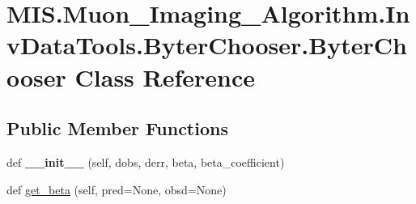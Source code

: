 \hypertarget{classMIS_1_1Muon__Imaging__Algorithm_1_1InvDataTools_1_1ByterChooser_1_1ByterChooser}{}\section{M\+I\+S.\+Muon\+\_\+\+Imaging\+\_\+\+Algorithm.\+Inv\+Data\+Tools.\+Byter\+Chooser.\+Byter\+Chooser Class Reference}
\label{classMIS_1_1Muon__Imaging__Algorithm_1_1InvDataTools_1_1ByterChooser_1_1ByterChooser}
\subsection*{Public Member Functions}
\begin{DoxyCompactItemize}
\item 
\mbox{\label{classMIS_1_1Muon__Imaging__Algorithm_1_1InvDataTools_1_1ByterChooser_1_1ByterChooser_a577847bbf88d79ed216832443b22cf7e}} 
def {\bfseries \+\_\+\+\_\+init\+\_\+\+\_\+} (self, dobs, derr, beta, beta\+\_\+coefficient)
\item 
def \hyperlink{classMIS_1_1Muon__Imaging__Algorithm_1_1InvDataTools_1_1ByterChooser_1_1ByterChooser_ac663bcd137be87be408814145d494fc1}{get\+\_\+beta} (self, pred=None, obsd=None)
\end{DoxyCompactItemize}
